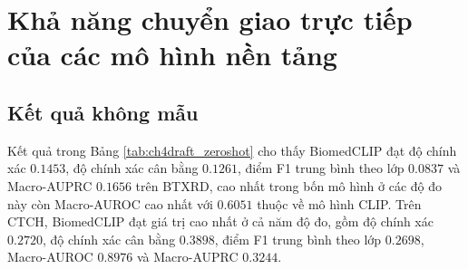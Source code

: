 \begin{table}[H]
\centering
{}
\caption{Cấu hình chính của các thực nghiệm}
\label{tab:hyperparameters_summary}
\end{table}

\section{Khả năng chuyển giao trực tiếp của các mô hình nền tảng}
\label{sec:foundation_transfer}

\subsection{Kết quả không mẫu}
\label{subsec:foundation_model_evaluation}
Kết quả trong Bảng \ref{tab:ch4draft_zeroshot} cho thấy BiomedCLIP đạt độ chính xác $0{.}1453$, độ chính xác cân bằng $0{.}1261$, điểm F1 trung bình theo lớp $0{.}0837$ và Macro-AUPRC $0{.}1656$ trên BTXRD, cao nhất trong bốn mô hình ở các độ đo này còn Macro-AUROC cao nhất với $0{.}6051$ thuộc về mô hình CLIP. Trên CTCH, BiomedCLIP đạt giá trị cao nhất ở cả năm độ đo, gồm độ chính xác $0{.}2720$, độ chính xác cân bằng $0{.}3898$, điểm F1 trung bình theo lớp $0{.}2698$, Macro-AUROC $0{.}8976$ và Macro-AUPRC $0{.}3244$.

